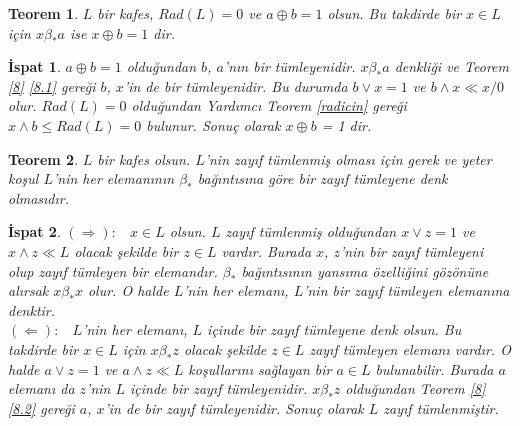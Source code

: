 \documentclass[a4paper,12pt]{article}
\numberwithin{equation}{section}
\theoremstyle{italik}
\newtheorem{teorem}{Teorem}[section]
\newtheorem*{ispat}{İspat}
\begin{document}
\begin{teorem}\label{22}
  $ L $ bir kafes, $ Rad(L)=0 $ ve $ a \oplus b = 1 $ olsun. Bu takdirde bir $ x \in L $ için
  $ x \beta_* a $ ise $ x \oplus b = 1 $ dir.
\end{teorem}
\begin{ispat}
  $ a \oplus b = 1 $ olduğundan $ b $, $ a $'nın bir tümleyenidir. $ x \beta_* a $ denkliği ve
  Teorem \ref{8} \ref{8.1} gereği $ b $, $ x $'in de bir tümleyenidir.
  Bu durumda $ b \vee x = 1 $ ve $ b \wedge x \ll x/0 $ olur.
  $ Rad(L) = 0 $ olduğundan Yardımcı Teorem \ref{radicin} gereği $ x \wedge b \leq Rad(L) =0 $ bulunur. 
  Sonuç olarak $ x \oplus b $ = 1 dir.
\end{ispat}


\begin{teorem}\label{23}
  $ L $ bir kafes olsun. $ L $'nin zayıf tümlenmiş olması için gerek ve yeter koşul 
  $ L $'nin her elemanının $ \beta_* $ bağıntısına göre bir zayıf tümleyene denk olmasıdır.
\end{teorem}
\begin{ispat}
  $( \Rightarrow ):$ \ $ x \in L $ olsun. $ L $ zayıf tümlenmiş olduğundan $ x \vee z = 1 $ ve 
  $ x \wedge z \ll L $ olacak şekilde bir $ z \in L $ vardır. Burada $ x $, $ z $'nin bir zayıf 
  tümleyeni olup zayıf tümleyen bir elemandır. $ \beta_* $ bağıntısının yansıma özelliğini 
  gözönüne alırsak $ x \beta_* x $ olur. O halde $ L $'nin her elemanı, $ L $'nin bir 
  zayıf tümleyen elemanına denktir. \\ 
  $( \Leftarrow ): $ \  $ L $'nin her elemanı, $ L $ içinde bir zayıf tümleyene denk olsun. 
  Bu takdirde bir $ x \in L $ için $ x \beta_* z $ olacak şekilde $ z \in L $ zayıf tümleyen 
  elemanı vardır. O halde $ a \vee z = 1 $ ve $ a \wedge z \ll L $ koşullarını sağlayan 
  bir $ a \in L $ bulunabilir. Burada $ a $ elemanı da $ z $'nin $ L $ içinde bir zayıf tümleyenidir. 
  $ x \beta_* z $ olduğundan Teorem \ref{8} \ref{8.2} gereği $ a $, $ x $'in de bir zayıf tümleyenidir. 
  Sonuç olarak $ L $ zayıf tümlenmiştir. 
\end{ispat}
\end{document}
